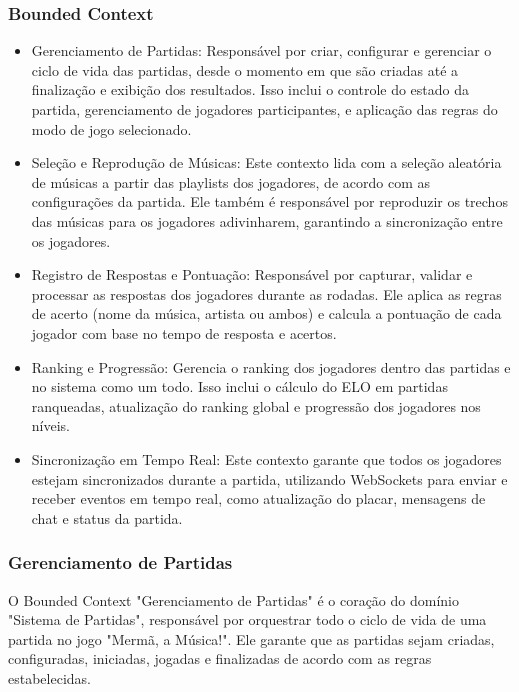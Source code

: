\subsubsection{Bounded Context}
    \begin{itemize}
        \item Gerenciamento de Partidas: Responsável por criar, configurar e gerenciar o ciclo de vida das partidas, desde o momento em que são criadas até a finalização e exibição dos resultados.  Isso inclui o controle do estado da partida, gerenciamento de jogadores participantes, e aplicação das regras do modo de jogo selecionado.
        \item Seleção e Reprodução de Músicas: Este contexto lida com a seleção aleatória de músicas a partir das playlists dos jogadores, de acordo com as configurações da partida.  Ele também é responsável por reproduzir os trechos das músicas para os jogadores adivinharem, garantindo a sincronização entre os jogadores.
        \item Registro de Respostas e Pontuação: Responsável por capturar, validar e processar as respostas dos jogadores durante as rodadas.  Ele aplica as regras de acerto (nome da música, artista ou ambos) e calcula a pontuação de cada jogador com base no tempo de resposta e acertos.
        \item Ranking e Progressão: Gerencia o ranking dos jogadores dentro das partidas e no sistema como um todo.  Isso inclui o cálculo do ELO em partidas ranqueadas, atualização do ranking global e progressão dos jogadores nos níveis.
        \item Sincronização em Tempo Real: Este contexto garante que todos os jogadores estejam sincronizados durante a partida, utilizando WebSockets para enviar e receber eventos em tempo real, como atualização do placar, mensagens de chat e status da partida.
    \end{itemize}

\subsubsection{Gerenciamento de Partidas}

O Bounded Context "Gerenciamento de Partidas" é o coração do domínio "Sistema de Partidas", responsável por orquestrar todo o ciclo de vida de uma partida no jogo "Mermã, a Música!". Ele garante que as partidas sejam criadas, configuradas, iniciadas, jogadas e finalizadas de acordo com as regras estabelecidas.
